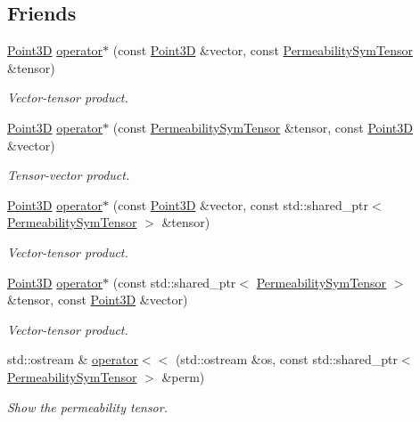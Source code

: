 \subsection*{Friends}
\begin{DoxyCompactItemize}
\item 
\hyperlink{classFVCode3D_1_1Point3D}{Point3D} \hyperlink{classFVCode3D_1_1PermeabilitySymTensor_a332d3765e083c2c18f2aa720c56f1115}{operator$\ast$} (const \hyperlink{classFVCode3D_1_1Point3D}{Point3D} \&vector, const \hyperlink{classFVCode3D_1_1PermeabilitySymTensor}{Permeability\+Sym\+Tensor} \&tensor)
\begin{DoxyCompactList}\small\item\em Vector-\/tensor product. \end{DoxyCompactList}\item 
\hyperlink{classFVCode3D_1_1Point3D}{Point3D} \hyperlink{classFVCode3D_1_1PermeabilitySymTensor_a939e706536dc232f6be632d5c47cea82}{operator$\ast$} (const \hyperlink{classFVCode3D_1_1PermeabilitySymTensor}{Permeability\+Sym\+Tensor} \&tensor, const \hyperlink{classFVCode3D_1_1Point3D}{Point3D} \&vector)
\begin{DoxyCompactList}\small\item\em Tensor-\/vector product. \end{DoxyCompactList}\item 
\hyperlink{classFVCode3D_1_1Point3D}{Point3D} \hyperlink{classFVCode3D_1_1PermeabilitySymTensor_a11bd7903b69bdb4d558844c080759ca4}{operator$\ast$} (const \hyperlink{classFVCode3D_1_1Point3D}{Point3D} \&vector, const std\+::shared\+\_\+ptr$<$ \hyperlink{classFVCode3D_1_1PermeabilitySymTensor}{Permeability\+Sym\+Tensor} $>$ \&tensor)
\begin{DoxyCompactList}\small\item\em Vector-\/tensor product. \end{DoxyCompactList}\item 
\hyperlink{classFVCode3D_1_1Point3D}{Point3D} \hyperlink{classFVCode3D_1_1PermeabilitySymTensor_a22e8070265d439a13c1e5a8db6cf2ec8}{operator$\ast$} (const std\+::shared\+\_\+ptr$<$ \hyperlink{classFVCode3D_1_1PermeabilitySymTensor}{Permeability\+Sym\+Tensor} $>$ \&tensor, const \hyperlink{classFVCode3D_1_1Point3D}{Point3D} \&vector)
\begin{DoxyCompactList}\small\item\em Vector-\/tensor product. \end{DoxyCompactList}\item 
std\+::ostream \& \hyperlink{classFVCode3D_1_1PermeabilitySymTensor_aa4a4d5ccabc3de51390b80ad1ca02d43}{operator$<$$<$} (std\+::ostream \&os, const std\+::shared\+\_\+ptr$<$ \hyperlink{classFVCode3D_1_1PermeabilitySymTensor}{Permeability\+Sym\+Tensor} $>$ \&perm)
\begin{DoxyCompactList}\small\item\em Show the permeability tensor. \end{DoxyCompactList}\end{DoxyCompactItemize}
